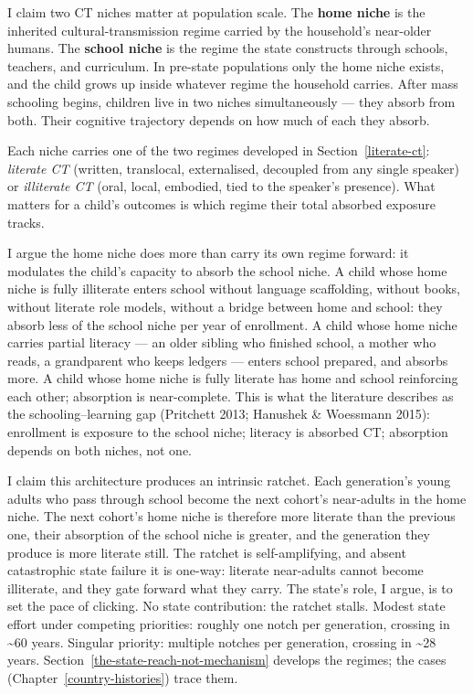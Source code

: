 \documentclass[12pt,letterpaper]{article}
\begin{document}
I claim two CT niches matter at population scale. The \textbf{home niche} is
the inherited cultural-transmission regime carried by the household's
near-older humans. The \textbf{school niche} is the regime the state
constructs through schools, teachers, and curriculum. In pre-state
populations only the home niche exists, and the child grows up inside
whatever regime the household carries. After mass schooling begins,
children live in two niches simultaneously --- they absorb from both.
Their cognitive trajectory depends on how much of each they absorb.

Each niche carries one of the two regimes developed in
Section~\ref{literate-ct}: \emph{literate CT} (written, translocal,
externalised, decoupled from any single speaker) or \emph{illiterate
CT} (oral, local, embodied, tied to the speaker's presence). What
matters for a child's outcomes is which regime their total absorbed
exposure tracks.

I argue the home niche does more than carry its own regime forward:
it modulates the child's capacity to absorb the school niche. A child
whose home niche is fully illiterate enters school without language
scaffolding, without books, without literate role models, without a
bridge between home and school: they absorb less of the school niche
per year of enrollment. A child whose home niche carries partial
literacy --- an older sibling who finished school, a mother who reads,
a grandparent who keeps ledgers --- enters school prepared, and
absorbs more. A child whose home niche is fully literate has home and
school reinforcing each other; absorption is near-complete. This is
what the literature describes as the schooling--learning gap
(Pritchett 2013; Hanushek \& Woessmann 2015): enrollment is exposure
to the school niche; literacy is absorbed CT; absorption depends on
both niches, not one.

I claim this architecture produces an intrinsic ratchet. Each generation's
young adults who pass through school become the next cohort's
near-adults in the home niche. The next cohort's home niche is
therefore more literate than the previous one, their
absorption of the school niche is greater, and the generation they
produce is more literate still. The ratchet is self-amplifying, and
absent catastrophic state failure it is one-way: literate near-adults
cannot become illiterate, and they gate forward what they carry. The
state's role, I argue, is to set the pace of clicking. No state contribution:
the ratchet stalls. Modest state effort under competing priorities:
roughly one notch per generation, crossing in \textasciitilde 60
years. Singular priority: multiple notches per generation, crossing
in \textasciitilde 28 years. Section~\ref{the-state-reach-not-mechanism}
develops the regimes; the cases (Chapter~\ref{country-histories}) trace
them.
\end{document}
